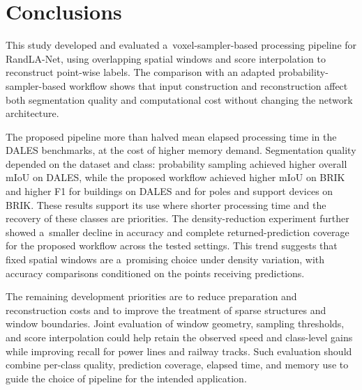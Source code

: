 \section{Conclusions}

This study developed and evaluated a~voxel-sampler-based processing pipeline for RandLA-Net, using overlapping spatial windows and score interpolation to reconstruct point-wise labels. The comparison with an adapted probability-sampler-based workflow shows that input construction and reconstruction affect both segmentation quality and computational cost without changing the network architecture.

The proposed pipeline more than halved mean elapsed processing time in the DALES benchmarks, at the cost of higher memory demand. Segmentation quality depended on the dataset and class: probability sampling achieved higher overall mIoU on DALES, while the proposed workflow achieved higher mIoU on BRIK and higher F1 for buildings on DALES and for poles and support devices on BRIK. These results support its use where shorter processing time and the recovery of these classes are priorities. The density-reduction experiment further showed a~smaller decline in accuracy and complete returned-prediction coverage for the proposed workflow across the tested settings. This trend suggests that fixed spatial windows are a~promising choice under density variation, with accuracy comparisons conditioned on the points receiving predictions.

The remaining development priorities are to reduce preparation and reconstruction costs and to improve the treatment of sparse structures and window boundaries. Joint evaluation of window geometry, sampling thresholds, and score interpolation could help retain the observed speed and class-level gains while improving recall for power lines and railway tracks. Such evaluation should combine per-class quality, prediction coverage, elapsed time, and memory use to guide the choice of pipeline for the intended application.

